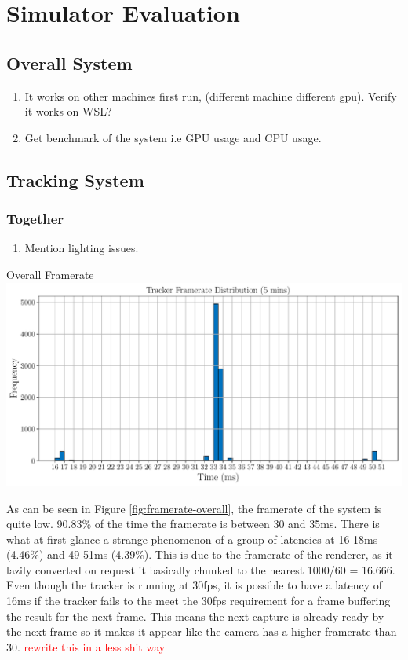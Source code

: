 \section{Simulator Evaluation}

\subsection{Overall System}
\begin{enumerate}
	\item It works on other machines first run, (different machine different gpu). Verify it works on WSL?
	\item Get benchmark of the system i.e GPU usage and CPU usage.
\end{enumerate}

\subsection{Tracking System}
\subsubsection{Together}
\begin{enumerate}
	\item Mention lighting issues.
\end{enumerate}

\begin{figureBox}[label={fig:framerate-overall}, width=1.0\linewidth]{Overall Framerate}
	\includegraphics[width = 1.0\linewidth]{./evaluation/figures/framerate-overall.pdf}
\end{figureBox}

As can be seen in Figure \ref{fig:framerate-overall}, the framerate of the system is quite low. 90.83\% of the time the framerate is between 30 and 35ms. There is what at first glance a strange phenomenon of a group of latencies at 16-18ms (4.46\%) and 49-51ms (4.39\%). This is due to the framerate of the renderer, as it lazily converted on request it basically chunked to the nearest 1000/60 = 16.666. Even though the tracker is running at 30fps, it is possible to have a latency of 16ms if the tracker fails to the meet the 30fps requirement for a frame buffering the result for the next frame. This means the next capture is already ready by the next frame so it makes it appear like the camera has a higher framerate than 30. \textcolor{red}{rewrite this in a less shit way}

